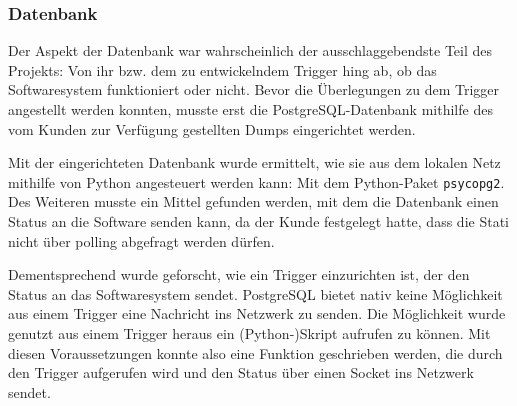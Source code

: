 
\subsubsection{Datenbank}
Der Aspekt der Datenbank war wahrscheinlich der ausschlaggebendste Teil des Projekts: Von ihr bzw. dem zu entwickelndem Trigger hing ab, ob das Softwaresystem funktioniert oder nicht. Bevor die Überlegungen zu dem Trigger angestellt werden konnten, musste erst die PostgreSQL-Datenbank mithilfe des vom Kunden zur Verfügung gestellten Dumps eingerichtet werden.

Mit der eingerichteten Datenbank wurde ermittelt, wie sie aus dem lokalen Netz mithilfe von Python angesteuert werden kann: Mit dem Python-Paket \texttt{psycopg2}. Des Weiteren musste ein Mittel gefunden werden, mit dem die Datenbank einen Status an die Software senden kann, da der Kunde festgelegt hatte, dass die Stati nicht über polling abgefragt werden dürfen.

Dementsprechend wurde geforscht, wie ein Trigger einzurichten ist, der den Status an das Softwaresystem sendet. PostgreSQL bietet nativ keine Möglichkeit aus einem Trigger eine Nachricht ins Netzwerk zu senden. Die Möglichkeit wurde genutzt aus einem Trigger heraus ein (Python-)Skript aufrufen zu können. Mit diesen Voraussetzungen konnte also eine Funktion geschrieben werden, die durch den Trigger aufgerufen wird und den Status über einen Socket ins Netzwerk sendet.

